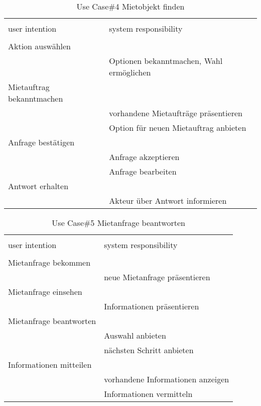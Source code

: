 \begin{table}[H]
\caption{Use Case\#4 Mietobjekt finden }
\centering
\begin{tabular}{l l}
\\ [-0.5ex]

\hline\hline
\\ [-0.5ex]
user intention & system responsibility
\\ [1.5ex]
\hline
\\ [-0.5ex]
Aktion auswählen 			& 											 \\[1ex]
							& Optionen bekanntmachen, Wahl ermöglichen	 \\[1ex]
Mietauftrag bekanntmachen	& 											 \\[1ex]
							& vorhandene Mietaufträge präsentieren		 \\[1ex]
							& Option für neuen Mietauftrag anbieten      \\[1ex]
Anfrage bestätigen   		& 											 \\[1ex] 
							& Anfrage akzeptieren						 \\[1ex]
							& Anfrage bearbeiten 						\\[1ex]
Antwort erhalten			& 											 \\[1ex]
							& Akteur über Antwort informieren			 \\[1ex]

\hline
\end{tabular}
\label{tab:mietobjektUC}
\end{table}

\begin{table}[H]
\caption{Use Case\#5 Mietanfrage beantworten }
\centering
\begin{tabular}{l l}
\\ [-0.5ex]

\hline\hline
\\ [-0.5ex]
user intention & system responsibility
\\ [1.5ex]
\hline
\\ [-0.5ex]
Mietanfrage bekommen 		& 											 \\[1ex]
							& neue Mietanfrage präsentieren				 \\[1ex]
Mietanfrage einsehen		& 											 \\[1ex]
							& Informationen präsentieren				 \\[1ex]
Mietanfrage beantworten  	& 											 \\[1ex] 
							& Auswahl anbieten							 \\[1ex]
							& nächsten Schritt anbieten					 \\[1ex]
Informationen mitteilen		& 											 \\[1ex]
							& vorhandene Informationen anzeigen			 \\[1ex]
							& Informationen vermitteln					 \\[1ex]


\hline
\end{tabular}
\label{tab:mietanfrageUC}
\end{table}

